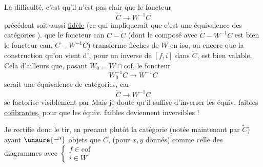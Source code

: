 
La difficulté, c'est qu'il n'est pas clair que le foncteur
\[\widetilde C\longrightarrow W^{-1}C\]
précédent soit aussi \uline{fidèle} (ce qui impliquerait que c'est une équivalence des catégories ).   que le foncteur can $C\mathbin{-}\widetilde C$ (dont le composé avec $\widetilde C\mathbin{-}W^{-1}C$ est bien le foncteur can. $C\mathbin{-}W^{-1}C$) transforme flèches de $W$ en iso, ou encore que la construction qu'on vient d', pour   un inverse de $[f,i]$ dans $\widetilde C$, est bien valable, 
Cela  d'ailleurs  que,  posant $W_0=W\cap\mathrm{cof}$, le foncteur
\[W_0^{-1}C\longrightarrow W^{-1}C\]
serait une équivalence de catégories, car
\[\widetilde C\longrightarrow W^{-1}C\]
se factorise visiblement par
Mais je doute qu'il suffise d'inverser les équiv. faibles \uline{cofibrantes}, pour que  les équiv. faibles deviennent inversibles !

Je rectifie donc le tir, en prenant plutôt la catégorie (notée maintenant par $\widetilde C$) ayant $\unsure{=^{\mathrm{s}}}$ objets que $C$,     (pour $x,y$ donnés) comme celle des diagrammes
avec $\left\{\begin{array}{l}f\in\mathrm{cof}\\i\in W\end{array}\right.$

